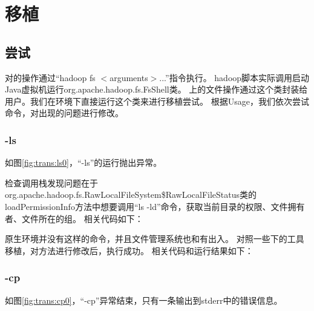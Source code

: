 %
\chapter{\HadoopFS 移植}
\label{ch:trans}

%
%
\section{尝试}
\label{sec:trans:try}
对{\HFS}的操作通过``hadoop fs $<$arguments$>$...''指令执行。
hadoop脚本实际调用启动Java虚拟机运行org.apache.hadoop.fs.FsShell类。
{\HFS}上的文件操作通过这个类封装给用户。我们在{\Windows}环境下直接运行这个类来进行移植尝试。
根据Usage，我们依次尝试命令，对出现的问题进行修改。

%
%
\subsection{-ls}
\label{subsec:trans:ls}
如图\ref{fig:trans:ls0}，``-ls''的运行抛出异常。


检查调用栈发现问题在于org.apache.hadoop.fs.RawLocalFileSystem\$RawLocalFileStatus类的loadPermissionInfo方法中想要调用``ls -ld''命令，获取当前目录的权限、文件拥有者、文件所在的组。
相关代码如下：



原生{\Windows}环境并没有这样的命令，并且文件管理系统也和{\Unix}有出入。
对照一些{\Windows}下的{\Unix}工具移植，对方法进行修改后，执行成功。
相关代码和运行结果如下：



%
%
\subsection{-cp}
\label{subsec:trans:cp}

如图\ref{fig:trans:cp0}，``-cp''异常结束，只有一条输出到stderr中的错误信息。

